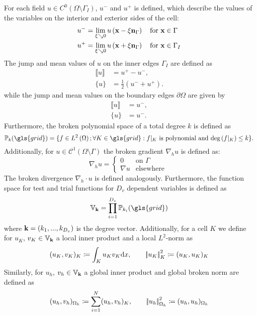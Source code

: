 For each field ${u} \in C^0\left(\Omega\setminus \Gamma_I\right)$, ${u}^-$  and ${u}^+$ is defined, which describe the values of the variables on the interior and exterior sides of the cell:
\begin{align}
	{u}^- & = \lim_{\xi \searrow 0} {u}\left(\textbf{x} - \xi \textbf{n}_{\Gamma}\right) \quad \text{for } \textbf{x}\in \Gamma   \\
	{u}^+ & = \lim_{\xi \searrow 0} {u}\left(\textbf{x} + \xi \textbf{n}_{\Gamma}\right) \quad \text{for } \textbf{x}\in \Gamma_I
\end{align}
The jump and mean values of ${u}$ on the inner edges $\Gamma_I$ are defined as
\begin{align}
	\llbracket {u} \rrbracket & = {u}^+-{u}^-,                           \\
	\{{u}\}                   & = \frac{1}{2} \left({u}^-+{u}^+\right).
\end{align}
while the jump and mean values on the boundary edges $\partial \Omega$ are given by
\begin{align}
	\llbracket {u} \rrbracket & = {u}^-,  \\
	\{{u}\}                   & = {u}^-.
\end{align}
Furthermore, the broken polynomial space of a total degree $k$ is defined as
\begin{equation}
	\mathbb{P}_k(\gls{grid} )= \{f \in L^2\left(\Omega\right); \forall K \in \gls{grid} : f\vert_{K} \text{ is polynomial and deg}\left(f\vert_{K}\right)\leq k \}.
	\label{Eq:PolSpace}
\end{equation}
Additionally, for $u \in \mathcal{C}^1(\Omega \setminus \Gamma)$ the broken gradient $\nabla_h u$ is defined as:
\begin{equation}
	\nabla_h u
	= \begin{cases}
		0
		 & \text{on }\Gamma  \\
		\nabla u
		 & \text{elsewhere }
	\end{cases}
\end{equation}
The broken divergence $\nabla_h \cdot u$ is defined analogously. Furthermore, the function space for test and trial functions for $D_v$ dependent variables is defined as
\begin{equation}
	\mathbb{V}_\myvector{k} = \prod_{i=1}^{D_v} \mathbb{P}_{k_i}(\gls{grid})
	\label{Eq:Vspace}
\end{equation}
where $\textbf{k} = \left(k_1,...,k_{D_v}\right)$ is the degree vector. 
Additionally, for a cell $K$ we define for $u_K$, $v_K\in \mathbb{V}_{\textbf{k}}$ a local inner product and a local $L^2$-norm as
\begin{equation}
(u_K, v_K)_K \coloneqq \int_K u_K v_K\text{d}x, \qquad \left|\!\left| {u_K} \right|\!\right|^2_K \coloneqq(u_K,u_K)_K
\end{equation}
Similarly, for $u_h$, $v_h \in \mathbb{V}_{\textbf{k}}$ a global inner product and global broken norm are defined as
\begin{equation}
	(u_h, v_h)_{\Omega_h} \coloneqq \sum_{i = 1}^N (u_h, v_h)_K, \qquad \left|\!\left| {u_h} \right|\!\right|^2_{\Omega_h} \coloneqq(u_h,u_h)_{\Omega_h}
\end{equation}

